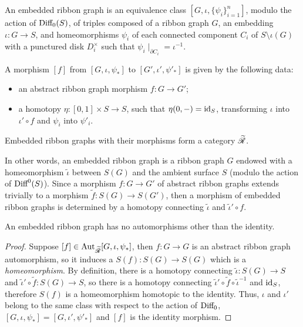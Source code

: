 \begin{definition}\label{dfn:embedded-rg}
  An embedded ribbon graph is an equivalence class $[G, \iota,
  \{\psi_i\}_{i=1}^n]$, modulo the action of $\textrm{Diff}_0(S)$, of triples
  composed of a ribbon graph $G$, an embedding $\iota:G\to S$, and
  homeomorphisms $\psi_i$ of each connected component $C_i$ of $S \setminus \iota(G)$
  with a punctured disk $D_i^\times$ such that $\psi_i\mid_{\partial C_i} = \iota^{-1}$.

  A morphism $[f]$ from $[G, \iota, \psi_*]$ to $[G', \iota', \psi'_*]$ is given by
  the following data:
  \begin{itemize}
  \item an abstract ribbon graph morphism $f:G\to G'$;
  \item a homotopy $\eta:[0,1] \times S\to S$, such that $\eta(0,-) = \operatorname{id}_S$,
    transforming $\iota$ into $\iota' \circ f$ and $\psi_i$ into $\psi'_i$.%
  \end{itemize}

  Embedded ribbon graphs with their morphisms form a category $\mathscr{\widetilde R}$.
\end{definition}
In other words, an embedded ribbon graph is a ribbon graph $G$ endowed
with a homeomorphism ${\tilde \iota}$ between $S(G)$ and the ambient
surface $S$ (modulo the action of $\textrm{Diff}^0(S)$).%
Since a morphism $f:G\to G'$ of abstract ribbon graphs extends trivially
to a morphism ${\tilde f}:S(G)\to S(G')$, then a morphism of embedded
ribbon graphs is determined by a homotopy connecting ${\tilde \iota}$ and
${\tilde \iota' \circ f}$.

\begin{lemma}
  \label{lemma:erg-no-aut}
  An embedded ribbon graph has no automorphisms other than the identity.
\end{lemma}
\begin{proof}
  Suppose $[f] \in \operatorname{Aut}_{\mathscr{\widetilde R}}[G, \iota, \psi_*]$, then $f:G\to G$ is an abstract
  ribbon graph automorphism, so it induces a $S(f): S(G) \to S(G)$
  which is a \emph{homeomorphism}.  By definition, there is a homotopy
  connecting ${\tilde \iota}: S(G) \to S$ and ${\tilde \iota'} \circ {\tilde f}:
  S(G)\to S$, so there is a homotopy connecting ${\tilde \iota'} \circ {\tilde f}
  \circ {\tilde \iota}^{-1}$ and $\operatorname{id}_S$, therefore $S(f)$ is a
  homeomorphism homotopic to the identity.  Thus, $\iota$ and $\iota'$ belong
  to the same class with respect to the action of $\textrm{Diff}_0$, $[G, \iota,
  \psi_*] = [G, \iota', \psi'_*]$ and $[f]$ is the identity morphism.
\end{proof}

